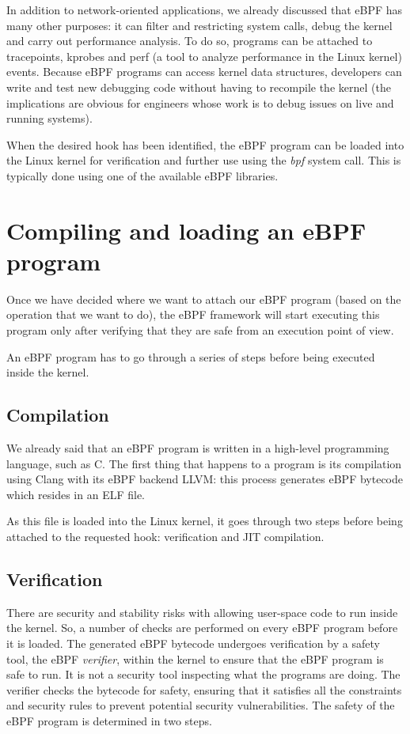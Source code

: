 In addition to network-oriented applications, we already discussed that eBPF has many other purposes: it can filter and restricting system calls, debug the kernel and carry out performance analysis.
To do so, programs can be attached to tracepoints, kprobes and perf (a tool to analyze performance in the Linux kernel) events.
Because eBPF programs can access kernel data structures, developers can write and test new debugging code without having to recompile the kernel (the implications are obvious for engineers whose work is to debug issues on live and running systems).

When the desired hook has been identified, the eBPF program can be loaded into the Linux kernel for verification and further use using the \textit{bpf} system call. 
This is typically done using one of the available eBPF libraries. 

\section{Compiling and loading an eBPF program}

Once we have decided where we want to attach our eBPF program (based on the operation that we want to do), the eBPF framework will start executing this program only after verifying that they are safe from an execution point of view. 

An eBPF program has to go through a series of steps before being executed inside the kernel.

\subsection{Compilation}

We already said that an eBPF program is written in a high-level programming language, such as C.
The first thing that happens to a program is its compilation using Clang with its eBPF backend LLVM: this process generates eBPF bytecode which resides in an ELF file.

As this file is loaded into the Linux kernel, it goes through two steps before being attached to the requested hook: verification and JIT compilation.

\subsection{Verification}

There are security and stability risks with allowing user-space code to run inside the kernel. 
So, a number of checks are performed on every eBPF program before it is loaded. 
The generated eBPF bytecode undergoes verification by a safety tool, the eBPF \textit{verifier}, within the kernel to ensure that the eBPF program is safe to run.
It is not a security tool inspecting what the programs are doing.
The verifier checks the bytecode for safety, ensuring that it satisfies all the constraints and security rules to prevent potential security vulnerabilities.
The safety of the eBPF program is determined in two steps.

